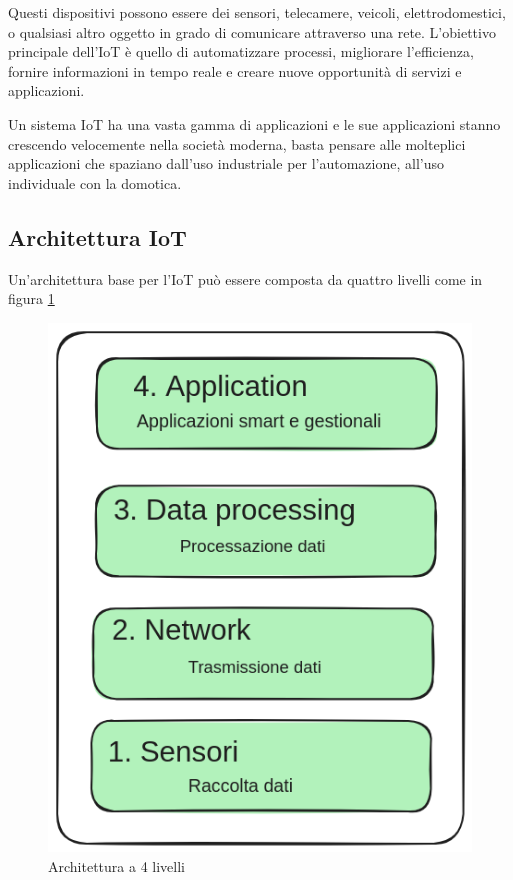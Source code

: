 Questi dispositivi possono essere 
dei sensori, telecamere, veicoli, elettrodomestici,
o qualsiasi altro oggetto in grado di comunicare
attraverso una rete.
L'obiettivo principale dell'IoT è quello di automatizzare processi,
migliorare l'efficienza, fornire informazioni in tempo reale
e creare nuove opportunità di servizi e applicazioni.

Un sistema IoT ha una vasta gamma di applicazioni e le sue applicazioni 
stanno crescendo velocemente nella società moderna, basta pensare alle
molteplici applicazioni che spaziano dall'uso industriale
per l'automazione, all'uso individuale con la domotica.

\subsection{Architettura IoT}

Un'architettura base per l'IoT può essere composta da quattro
livelli come in figura \ref{fig:architettura_iot}

\begin{figure}[!htp]
    \centering
    \includegraphics[keepaspectratio=true,scale=0.3]{images/architettura_iot.png}
	\caption{Architettura a 4 livelli}
  	\label{fig:architettura_iot}
\end{figure}


